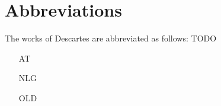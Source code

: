 \chapter{Abbreviations}

The works of Descartes are abbreviated as follows: TODO

\begin{itemize}
    \item[AT] 
    \item[NLG] 
    \item[OLD] 
\end{itemize}
